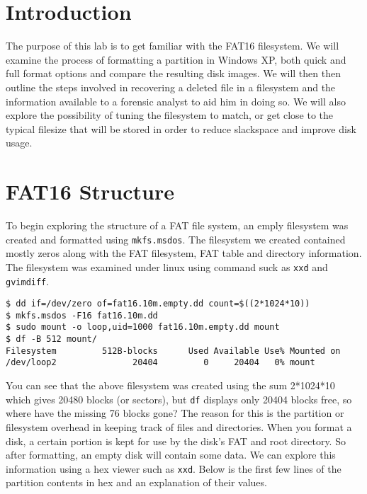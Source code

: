 \documentclass[a4paper,
    11pt,
    normalheadings,
    parindent,
    UKenglish,
    abstracton,
    ]{scrartcl}
\title{\mytitle{}}
\author{
    cand. Dipl. Inf. Tobias Müller <\href{mailto:muellet2@computing.dcu.ie?subject=ss10-forensic-lab01}{muellet2@}>, 59212333 \and
    BSc. Anthony Walters <\href{mailto:waltera3@computing.dcu.ie?subject=ss10-forensic-lab01}{waltera3@}>, 59213102
    }
\date{\today}
\begin{document}
\maketitle


\section{Introduction}
The purpose of this lab is to get familiar with the FAT16 filesystem. We will examine the process of formatting a partition in Windows XP, both quick and full format options and compare the resulting disk images. We will then then outline the steps involved in recovering a deleted file in a filesystem and the information available to a forensic analyst to aid him in doing so. We will also explore the possibility of tuning the filesystem to match, or get close to the typical filesize that will be stored in order to reduce slackspace and improve disk usage.

\section{FAT16 Structure}

To begin exploring the structure of a FAT file system, an emply filesystem was created and formatted using \texttt{mkfs.msdos}. The filesystem we created contained mostly zeros along with the FAT filesystem, FAT table and directory information. The filesystem was examined under linux using command suck as \texttt{xxd} and \texttt{gvimdiff}. 
\begin{verbatim}
$ dd if=/dev/zero of=fat16.10m.empty.dd count=$((2*1024*10))
$ mkfs.msdos -F16 fat16.10m.dd
$ sudo mount -o loop,uid=1000 fat16.10m.empty.dd mount
$ df -B 512 mount/
Filesystem         512B-blocks      Used Available Use% Mounted on
/dev/loop2               20404         0     20404   0% mount
\end{verbatim}
You can see that the above filesystem was created using the sum 2*1024*10 which gives 20480 blocks (or sectors), but \texttt{df} displays only 20404 blocks free, so where have the missing 76 blocks gone? The reason for this is the partition or filesystem overhead in keeping track of files and directories. When you format a disk, a certain portion is kept for use by the disk's FAT and root directory. So after formatting, an empty disk will contain some data. We can explore this information using a hex viewer such as \texttt{xxd}. Below is the first few lines of the partition contents in hex and an explanation of their values.
\end{document}
